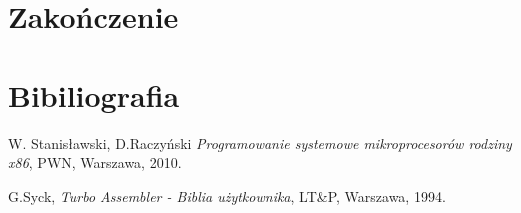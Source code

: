 \documentclass[a4paper,12pt]{article}
\begin{document}
	\section{Zakończenie}

	
	\section{Bibiliografia}
\begin{thebibliography}{999}
 W. Stanisławski, D.Raczyński 
{\em Programowanie systemowe mikroprocesorów rodziny x86},
PWN, Warszawa, 2010.

 G.Syck,
{\em Turbo Assembler - Biblia użytkownika}, 
LT\&P, Warszawa, 1994.



\end{thebibliography}	
\end{document}
